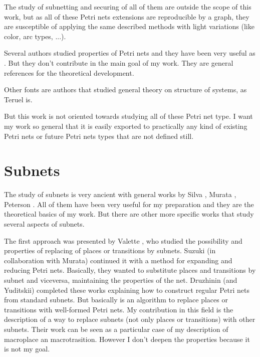 The study of
subnetting and securing of all of them are outside the scope of this work,
but as all of these Petri nets extensions are reproducible by a graph, they are
susceptible of applying the same described methods with light variations
(like color, arc types, ...). 

 
Several authors studied properties of Petri nets and they have been very
useful as \cite{PROP-Murata1977412,PROP-Engelfriet1991575,PROP-Silva1992447,PROP-Recalde1998223,PROP-Zeng20021308}.
But they don't contribute in the main goal of my work. They are general references
for the theoretical development. 
 
Other fonts are authors that studied general theory on structure of systems, as Teruel \cite{G-Teruel1996271} is. 

But this work is not oriented towards studying all of these Petri net type.
I want my work so general that it is easily exported to practically any kind
of existing Petri nets or future Petri nets types that are not defined still.

\section{Subnets}

The study of subnets is very ancient with general works by Silva \cite{G-Silva1985,G-Silva201213},
Murata \cite{G-Murata1977412,G-Murata1989541}, Peterson \cite{G-EPN-Peterson1981}. All of them have been very useful for my preparation and they are the theoretical basics of my work. But there are other more specific works that study several aspects of subnets.

The first approach was presented by Valette \cite{SN-Valette197935}, who
studied the possibility and properties of replacing of places or transitions by subnets.
Suzuki (in collaboration with Murata) \cite{SN-Suzuki198351} continued it
with a method
for expanding and reducing Petri nets. Basically, they wanted to substitute
places and transitions by subnet and viceversa, maintaining the properties
of the net. Druzhinin (and Yuditskii) \cite{SN-DRUZHININVA19921922} completed
these works explaining how to construct regular Petri nets from standard subnets.
But basically is an algorithm to replace places or transitions with well-formed
Petri nets. My contribution in this field is the description of a way to replace subnets (not only places or transitions) with other subnets. Their work can be seen as a particular
case of my description of macroplace an macrotrasition. However I don't deepen the properties because it is not my goal.


